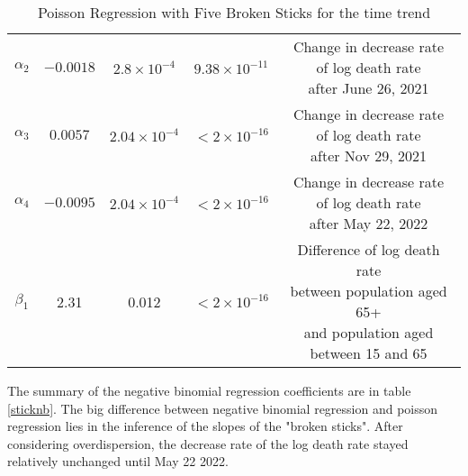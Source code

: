 \documentclass[12pt]{article}
\begin{document}
\begin{enumerate}[(a)]
\begin{table}[htbp]
\begin{tabular}{ccccc}
			\addlinespace[0.3cm]
			$\alpha_{2}$ & $-0.0018$ & $2.8\times 10^{-4}$ & $9.38\times 10^{-11}$& \makecell{Change in decrease rate \\ of log death rate\\ after June 26, 2021}\\
			\addlinespace[0.3cm]
			$\alpha_{3}$ & $0.0057$ & $2.04\times 10^{-4}$ & $<2\times 10^{-16}$& \makecell{Change in decrease rate \\ of log death rate\\ after Nov 29, 2021}\\
			\addlinespace[0.3cm]
			$\alpha_{4}$ & $-0.0095$ & $2.04\times 10^{-4}$ & $<2\times 10^{-16}$& \makecell{Change in decrease rate \\ of log death rate\\ after May 22, 2022}\\
			\addlinespace[0.3cm]
			$\beta_{1}$ & 2.31 & 0.012 & $<2\times 10^{-16}$ & \makecell{Difference of log death rate \\between population aged 65+ \\ and population aged between 15 and 65}\\
			\bottomrule
		\end{tabular}
		\caption{Poisson Regression with Five Broken Sticks for the time trend}\label{stickpoisson}
	\end{table}	
	
	
	The summary of the negative binomial regression coefficients are in table \ref{sticknb}. The big difference between negative binomial regression and poisson regression lies in the inference of the slopes of the "broken sticks". After considering overdispersion, the decrease rate of the log death rate stayed relatively unchanged until May 22 2022.
	

\end{enumerate}
\end{document}

